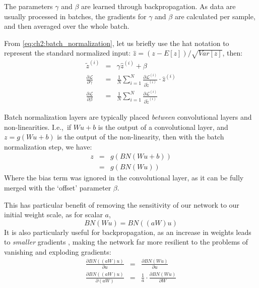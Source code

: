       The parameters $\gamma$ and $\beta$ are learned through backpropagation.
      As data are usually processed in batches, the gradients for $\gamma$ and
      $\beta$ are calculated per sample, and then averaged over the whole
      batch.

      From \autoref{eq:ch2:batch_normalization}, let us briefly use the hat
      notation to represent the standard normalized input:
      $\hat{z} = (z-E[z])/\sqrt{Var[z]}$, then:
      \begin{eqnarray}
        \tilde{z}^{(i)} & = & \gamma \hat{z}^{(i)} + \beta \nonumber\\
        \frac{\partial \mathcal{L}}{\partial \gamma}& =&
        \frac{1}{N}\sum_{i=1}^{N} \frac{\partial
        \mathcal{L}^{(i)}}{\partial \tilde{z}^{(i)}} \cdot \hat{z}^{(i)} \\
        \frac{\partial \mathcal{L}}{\partial \beta}& =&
        \frac{1}{N}\sum_{i=1}^{N} \frac{\partial
        \mathcal{L}^{(i)}}{\partial \tilde{z}^{(i)}} 
      \end{eqnarray}

      Batch normalization layers are typically placed \emph{between} convolutional layers
      and non-linearities. I.e.,\ if $Wu+b$ is the output of a convolutional
      layer, and $z=g(Wu+b)$ is the output of the non-linearity, then with the
      batch normalization step, we have:
      \begin{eqnarray}
        z &=& g(BN(Wu+b)) \nonumber\\
          &=& g(BN(Wu))
      \end{eqnarray}
      Where the bias term was ignored in the convolutional layer, as it can be
      fully merged with the `offset' parameter $\beta$.

      This has particular benefit of removing the sensitivity of our network to
      our initial weight scale, as for scalar $a$,
      \begin{equation}
        BN(Wu) = BN((aW)u)
      \end{equation}
      It is also particularly useful for backpropagation, as an increase in
      weights leads to \emph{smaller} gradients \citep{ioffe_batch_2015}, making
      the network far more resilient to the problems of vanishing and exploding
      gradients:
      \begin{eqnarray}
        \frac{\partial BN((aW)u)}{\partial u} & = & \frac{\partial
        BN(Wu)}{\partial u} \nonumber\\
        \frac{\partial BN((aW)u)}{\partial (aW)} & = & \frac{1}{a} \cdot \frac{\partial
        BN(Wu)}{\partial W} 
      \end{eqnarray}


